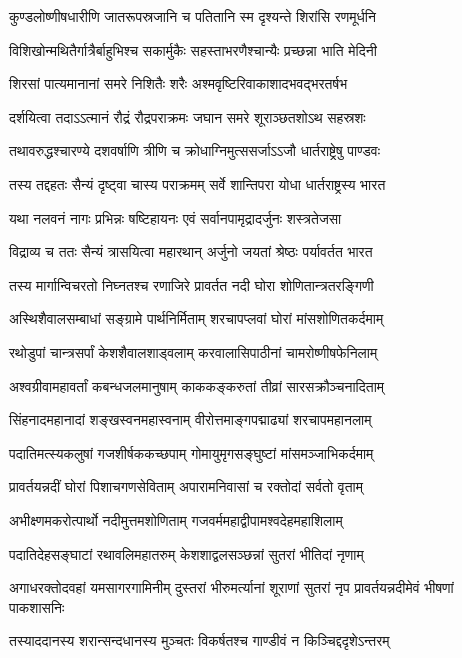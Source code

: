 \twolineshloka
{कुण्डलोष्णीषधारीणि जातरूपस्रजानि च}
{पतितानि स्म दृश्यन्ते शिरांसि रणमूर्धनि}


\twolineshloka
{विशिखोन्मथितैर्गात्रैर्बाहुभिश्च सकार्मुकैः}
{सहस्ताभरणैश्चान्यैः प्रच्छन्ना भाति मेदिनी}


\twolineshloka
{शिरसां पात्यमानानां समरे निशितैः शरैः}
{अश्मवृष्टिरिवाकाशादभवद्भरतर्षभ}


\twolineshloka
{दर्शयित्वा तदाऽऽत्मानं रौद्रं रौद्रपराक्रमः}
{जघान समरे शूराञ्छतशोऽथ सहस्रशः}


\twolineshloka
{तथावरुद्धश्चारण्ये दशवर्षाणि त्रीणि च}
{क्रोधाग्निमुत्ससर्जाऽऽजौ धार्तराष्ट्रेषु पाण्डवः}


\twolineshloka
{तस्य तद्दहतः सैन्यं दृष्ट्वा चास्य पराक्रमम्}
{सर्वे शान्तिपरा योधा धार्तराष्ट्रस्य भारत}


\twolineshloka
{यथा नलवनं नागः प्रभिन्नः षष्टिहायनः}
{एवं सर्वानपामृद्रादर्जुनः शस्त्रतेजसा}


\twolineshloka
{विद्राव्य च ततः सैन्यं त्रासयित्वा महारथान्}
{अर्जुनो जयतां श्रेष्ठः पर्यावर्तत भारत}


\twolineshloka
{तस्य मार्गान्विचरतो निघ्नतश्च रणाजिरे}
{प्रावर्तत नदी घोरा शोणितान्त्रतरङ्गिणी}


\twolineshloka
{अस्थिशैवालसम्बाधां सङ्ग्रामे पार्थनिर्मिताम्}
{शरचापप्लवां घोरां मांसशोणितकर्दमाम्}


\twolineshloka
{रथोडुपां चान्त्रसर्पां केशशैवालशाड्वलाम्}
{करवालासिपाठीनां चामरोष्णीषफेनिलाम्}


\twolineshloka
{अश्वग्रीवामहावर्तां कबन्धजलमानुषाम्}
{काककङ्करुतां तीव्रां सारसक्रौञ्चनादिताम्}


\twolineshloka
{सिंहनादमहानादां शङ्खस्वनमहास्वनाम्}
{वीरोत्तमाङ्गपद्माढ्यां शरचापमहानलाम्}


\twolineshloka
{पदातिमत्स्यकलुषां गजशीर्षककच्छपाम्}
{गोमायुमृगसङ्घुष्टां मांसमञ्जाभिकर्दमाम्}


\twolineshloka
{प्रावर्तयन्नदीं घोरां पिशाचगणसेविताम्}
{अपारामनिवासां च रक्तोदां सर्वतो वृताम्}


\twolineshloka
{अभीक्ष्णमकरोत्पार्थो नदीमुत्तमशोणिताम्}
{गजवर्ममहाद्वीपामश्वदेहमहाशिलाम्}


\twolineshloka
{पदातिदेहसङ्घाटां रथावलिमहातरुम्}
{केशशाद्वलसञ्छन्नां सुतरां भीतिदां नृणाम्}


\threelineshloka
{अगाधरक्तोदवहां यमसागरगामिनीम्}
{दुस्तरां भीरुमर्त्यानां शूराणां सुतरां नृप}
{प्रावर्तयन्नदीमेवं भीषणां पाकशासनिः}


\twolineshloka
{तस्याददानस्य शरान्सन्दधानस्य मुञ्चतः}
{विकर्षतश्च गाण्डीवं न किञ्चिद्ददृशेऽन्तरम्}

